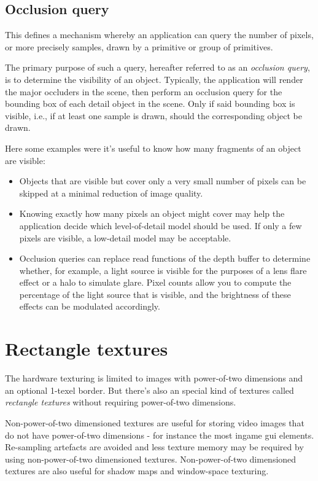\subsection{Occlusion query}
This defines a mechanism whereby an application can query the number of pixels, or more precisely samples, drawn by a primitive or group of primitives.

The primary purpose of such a query, hereafter referred to as an \emph{occlusion query}, is to determine the visibility of an object. Typically, the application will render the major occluders in the scene, then perform an occlusion query for the bounding box of each detail object in the scene. Only if said bounding box is visible, i.e., if at least one sample is drawn, should the corresponding object be drawn.

Here some examples were it's useful to know how many fragments of an object are visible:
\begin{itemize}
\item{Objects that are visible but cover only a very small number of pixels can be skipped at a minimal reduction of image quality.}
\item{Knowing exactly how many pixels an object might cover may help the application decide which level-of-detail model should be used. If only a few pixels are visible, a low-detail model may be acceptable.}
\item{Occlusion queries can replace read functions of the depth buffer to determine whether, for example, a light source is visible for the purposes of a lens flare effect or a halo to simulate glare. Pixel counts allow you to compute the percentage of the light source that is visible, and the brightness of these effects can be modulated accordingly.}
\end{itemize}




\section{Rectangle textures}
\hypertarget{Rectangle textures}{}
The hardware texturing is limited to images with power-of-two dimensions and an optional 1-texel border. But there's also an special kind of textures called \emph{rectangle textures} without requiring power-of-two dimensions.

Non-power-of-two dimensioned textures are useful for storing video images that do not have power-of-two dimensions - for instance the most ingame gui elements. Re-sampling artefacts are avoided and less texture memory may be required by using non-power-of-two dimensioned textures. Non-power-of-two dimensioned textures are also useful for shadow maps and window-space texturing.

